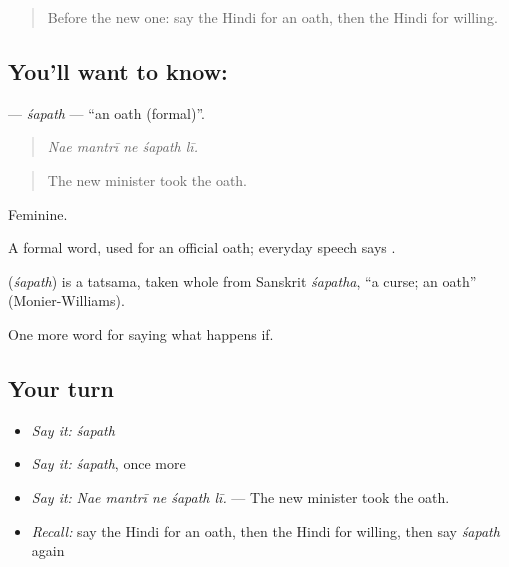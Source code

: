\begin{quote}
Before the new one: say the Hindi for an oath, then the Hindi for willing.
\end{quote}

\subsection*{You'll want to know: }
\textbf{} — \emph{śapath} — \textquotedblleft{}an oath (formal)\textquotedblright{}.

\begin{quote}
    
\end{quote}

\begin{quote}
\emph{Nae mantrī ne śapath lī.}
\end{quote}

\begin{quote}
The new minister took the oath.
\end{quote}

Feminine.

A formal word, used for an official oath; everyday speech says .

\begin{cousinweb}
\textbf{} (\emph{śapath}) is a tatsama, taken whole from Sanskrit \emph{śapatha}, \textquotedblleft{}a curse; an oath\textquotedblright{} (Monier-Williams).
\end{cousinweb}

\begin{grammarlens}[title={What you've built}]
One more word for saying what happens if.
\end{grammarlens}

\subsection*{Your turn}
\begin{itemize}
\raggedright
  \item \emph{Say it:} \emph{śapath}
  \item \emph{Say it:} \emph{śapath}, once more
  \item \emph{Say it:} \emph{Nae mantrī ne śapath lī.} — The new minister took the oath.
  \item \emph{Recall:} say the Hindi for an oath, then the Hindi for willing, then say \emph{śapath} again
\end{itemize}

